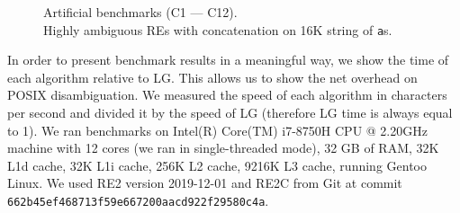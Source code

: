 \documentclass[AMA,STIX1COL]{WileyNJD-v2}
\begin{document}
\begin{figure}

    \caption{
    Artificial benchmarks (C1 --- C12).\\
    Highly ambiguous REs with concatenation on 16K string of \texttt{a}s.
    }\label{fig:benchc}
\end{figure}

In order to present benchmark results in a meaningful way, we show the time of each algorithm relative to LG.
This allows us to show the net overhead on POSIX disambiguation.
We measured the speed of each algorithm in characters per second and divided it by the speed of LG
(therefore LG time is always equal to 1).
%
We ran benchmarks on Intel(R) Core(TM) i7-8750H CPU @ 2.20GHz machine
with 12 cores (we ran in single-threaded mode),
32 GB of RAM,
32K L1d cache,
32K L1i cache,
256K L2 cache,
9216K L3 cache,
running Gentoo Linux.
We used RE2 version 2019-12-01
and RE2C from Git \cite{RE2C} at commit \texttt{662b45ef468713f59e667200aacd922f29580c4a}.
\end{document}
